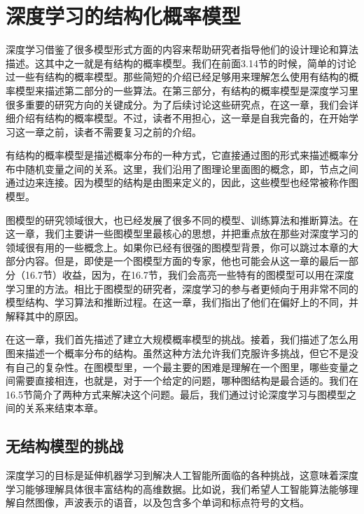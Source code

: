 \chapter{深度学习的结构化概率模型}
\label{chap:16}
深度学习借鉴了很多模型形式方面的内容来帮助研究者指导他们的设计理论和算法描述。这其中之一就是有结构的概率模型。我们在前面3.14节的时候，简单的讨论过一些有结构的概率模型。那些简短的介绍已经足够用来理解怎么使用有结构的概率模型来描述第二部分的一些算法。在第三部分，有结构的概率模型是深度学习里很多重要的研究方向的关键成分。为了后续讨论这些研究点，在这一章，我们会详细介绍有结构的概率模型。不过，读者不用担心，这一章是自我完备的，在开始学习这一章之前，读者不需要复习之前的介绍。

有结构的概率模型是描述概率分布的一种方式，它直接通过图的形式来描述概率分布中随机变量之间的关系。这里，我们沿用了图理论里面图的概念，即，节点之间通过边来连接。因为模型的结构是由图来定义的，因此，这些模型也经常被称作图模型。

图模型的研究领域很大，也已经发展了很多不同的模型、训练算法和推断算法。在这一章，我们主要讲一些图模型里最核心的思想，并把重点放在那些对深度学习的领域很有用的一些概念上。如果你已经有很强的图模型背景，你可以跳过本章的大部分内容。但是，即使是一个图模型方面的专家，他也可能会从这一章的最后一部分（16.7节）收益，因为，在16.7节，我们会高亮一些特有的图模型可以用在深度学习里的方法。相比于图模型的研究者，深度学习的参与者更倾向于用非常不同的模型结构、学习算法和推断过程。在这一章，我们指出了他们在偏好上的不同，并解释其中的原因。

在这一章，我们首先描述了建立大规模概率模型的挑战。接着，我们描述了怎么用图来描述一个概率分布的结构。虽然这种方法允许我们克服许多挑战，但它不是没有自己的复杂性。在图模型里，一个最主要的困难是理解在一个图里，哪些变量之间需要直接相连，也就是，对于一个给定的问题，哪种图结构是最合适的。我们在16.5节简介了两种方式来解决这个问题。最后，我们通过讨论深度学习与图模型之间的关系来结束本章。

\section{无结构模型的挑战}
深度学习的目标是延伸机器学习到解决人工智能所面临的各种挑战，这意味着深度学习能够理解具体很丰富结构的高维数据。比如说，我们希望人工智能算法能够理解自然图像，声波表示的语音，以及包含多个单词和标点符号的文档。


